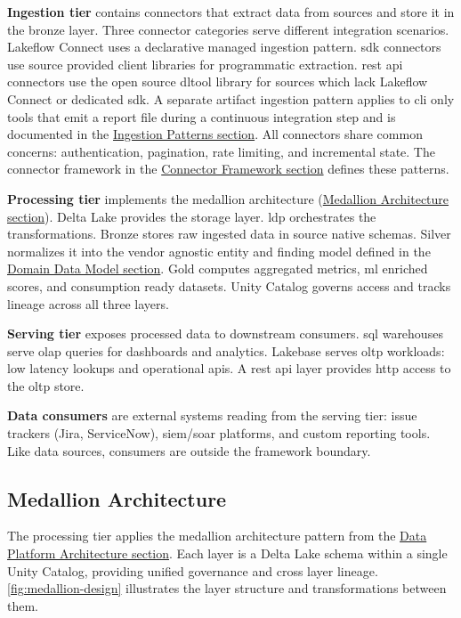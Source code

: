 \textbf{Ingestion tier} contains connectors that extract data from sources and store it in the bronze layer. Three connector categories serve different integration scenarios. Lakeflow Connect uses a declarative managed ingestion pattern. \gls{sdk} connectors use source provided client libraries for programmatic extraction. \gls{rest} \gls{api} connectors use the open source \gls{dltool} library for sources which lack Lakeflow Connect or dedicated \gls{sdk}. A separate artifact ingestion pattern applies to \gls{cli} only tools that emit a report file during a continuous integration step and is documented in the \hyperref[sec:ingestion-patterns]{Ingestion Patterns section}. All connectors share common concerns: authentication, pagination, rate limiting, and incremental state. The connector framework in the \hyperref[sec:connector-framework]{Connector Framework section} defines these patterns.

\textbf{Processing tier} implements the medallion architecture (\hyperref[sec:medallion-arch]{Medallion Architecture section}). Delta Lake provides the storage layer. \gls{ldp} orchestrates the transformations. Bronze stores raw ingested data in source native schemas. Silver normalizes it into the vendor agnostic entity and finding model defined in the \hyperref[sec:data-entities]{Domain Data Model section}. Gold computes aggregated metrics, \gls{ml} enriched scores, and consumption ready datasets. Unity Catalog governs access and tracks lineage across all three layers.

\textbf{Serving tier} exposes processed data to downstream consumers. \gls{sql} warehouses serve \gls{olap} queries for dashboards and analytics. Lakebase serves \gls{oltp} workloads: low latency lookups and operational \glspl{api}. A \gls{rest} \gls{api} layer provides \gls{http} access to the \gls{oltp} store.

\textbf{Data consumers} are external systems reading from the serving tier: issue trackers (Jira, ServiceNow), \gls{siem}/\gls{soar} platforms, and custom reporting tools. Like data sources, consumers are outside the framework boundary.


\subsection{Medallion Architecture}
\label{sec:medallion-arch}

The processing tier applies the medallion architecture pattern from the \hyperref[sec:data-architecture]{Data Platform Architecture section}. Each layer is a Delta Lake schema within a single Unity Catalog, providing unified governance and cross layer lineage. \autoref{fig:medallion-design} illustrates the layer structure and transformations between them.


